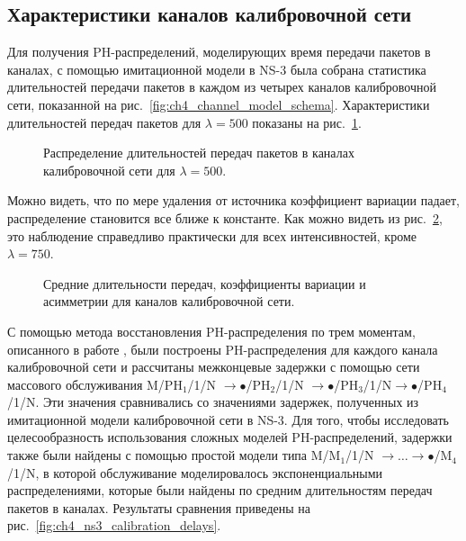 \subsection{Характеристики каналов калибровочной сети}

Для получения PH-распределений, моделирующих время передачи пакетов в каналах, с помощью имитационной модели в NS-3 была собрана статистика длительностей передачи пакетов в каждом из четырех каналов калибровочной сети, показанной на рис.~\ref{fig:ch4_channel_model_schema}. Характеристики длительностей передач пакетов для $\lambda = 500$ показаны на рис.~\ref{fig:ch4_ns3_calibration_links_densities}.

\begin{figure}[h]
  \caption{Распределение длительностей передач пакетов в каналах калибровочной сети для $\lambda = 500$.}
  \label{fig:ch4_ns3_calibration_links_densities}
\end{figure}

Можно видеть, что по мере удаления от источника коэффициент вариации падает, распределение становится все ближе к константе.
Как можно видеть из рис.~\ref{fig:ch4_ns3_calibration_links_koefs}, это наблюдение справедливо практически для всех интенсивностей, кроме $\lambda = 750$.

\begin{figure}[h]
  \caption{Средние длительности передач, коэффициенты вариации и асимметрии для каналов калибровочной сети.}
  \label{fig:ch4_ns3_calibration_links_koefs}
\end{figure}

С помощью метода восстановления PH-распределения по трем моментам, описанного в работе \cite{Johnson1989}, были построены PH-распределения для каждого канала калибровочной сети и рассчитаны межконцевые задержки с помощью сети массового обслуживания M/$\text{PH}_1$/1/N $\rightarrow \bullet$/$\text{PH}_2$/1/N $\rightarrow \bullet$/$\text{PH}_3$/1/N$ \rightarrow \bullet$/$\text{PH}_4$/1/N. Эти значения сравнивались со значениями задержек, полученных из имитационной модели калибровочной сети в NS-3. Для того, чтобы исследовать целесообразность использования сложных моделей PH-распределений, задержки также были найдены с помощью простой модели типа M/$\text{M}_1$/1/N $\rightarrow \dots \rightarrow \bullet$/$\text{M}_4$/1/N, в которой обслуживание моделировалось экспоненциальными распределениями, которые были найдены по средним длительностям передач пакетов в каналах. Результаты сравнения приведены на рис.~\ref{fig:ch4_ns3_calibration_delays}.

